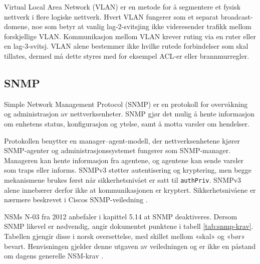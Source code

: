 Virtual Local Area Network (VLAN) er en metode for å segmentere et fysisk nettverk i flere logiske nettverk. Hvert VLAN fungerer som et separat broadcast-domene, noe som betyr at vanlig lag-2-svitsjing ikke videresender trafikk mellom forskjellige VLAN. Kommunikasjon mellom VLAN krever ruting via en ruter eller en lag-3-svitsj. VLAN alene bestemmer ikke hvilke rutede forbindelser som skal tillates, dermed må dette styres med for eksempel ACL-er eller brannmurregler.

\subsection{SNMP}

Simple Network Management Protocol (SNMP) er en protokoll for overvåkning og administrasjon av nettverksenheter. SNMP gjør det mulig å hente informasjon om enhetens status, konfigurasjon og ytelse, samt å motta varsler om hendelser.

Protokollen benytter en manager--agent-modell, der nettverksenhetene kjører SNMP-agenter og administrasjonssystemet fungerer som SNMP-manager. Manageren kan hente informasjon fra agentene, og agentene kan sende varsler som traps eller informs. SNMPv3 støtter autentisering og kryptering, men begge mekanismene brukes først når sikkerhetsnivået er satt til \texttt{authPriv}. SNMPv3 alene innebærer derfor ikke at kommunikasjonen er kryptert. Sikkerhetsnivåene er nærmere beskrevet i Ciscos SNMP-veiledning \cite{cisco_snmp_security}.

NSMs N-03 fra 2012 anbefaler i kapittel 5.14 at SNMP deaktiveres. Dersom SNMP likevel er nødvendig, angir dokumentet punktene i tabell \ref{tab:snmp-krav}. Tabellen gjengir disse i norsk oversettelse, med skillet mellom «skal» og «bør» bevart. Henvisningen gjelder denne utgaven av veiledningen og er ikke en påstand om dagens generelle NSM-krav \cite{nsm_n03}.

